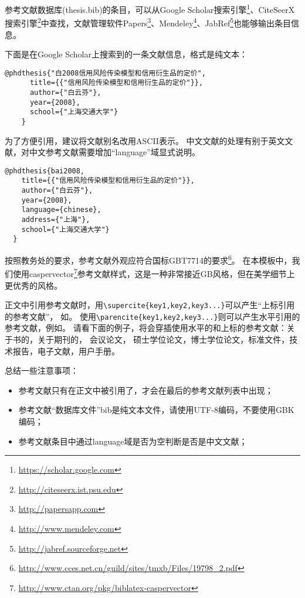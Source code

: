 参考文献数据库(thesis.bib)的条目，可以从Google Scholar搜索引擎\footnote{\url{https://scholar.google.com}}、CiteSeerX搜索引擎\footnote{\url{http://citeseerx.ist.psu.edu}}中查找，文献管理软件Papers\footnote{\url{http://papersapp.com}}、Mendeley\footnote{\url{http://www.mendeley.com}}、JabRef\footnote{\url{http://jabref.sourceforge.net}}也能够输出条目信息。

下面是在Google Scholar上搜索到的一条文献信息，格式是纯文本：

\begin{lstlisting}[caption={从Google Scholar找到的参考文献条目}, label=googlescholar, float, escapeinside="", numbers=none]
    @phdthesis{"白2008信用风险传染模型和信用衍生品的定价",
      title={{"信用风险传染模型和信用衍生品的定价"}},
      author={"白云芬"},
      year={2008},
      school={"上海交通大学"}
    } 
\end{lstlisting}

为了方便引用，建议将文献别名改用ASCII表示。
中文文献的处理有别于英文文献，对中文参考文献需要增加“language”域显式说明。

\begin{lstlisting}[caption={修改后的参考文献条目}, label=itemok, float, escapeinside="", numbers=none]
  @phdthesis{bai2008,
    title={{"信用风险传染模型和信用衍生品的定价"}},
    author={"白云芬"},
    year={2008},
    language={chinese},
    address={"上海"},
    school={"上海交通大学"}
  } 
\end{lstlisting}

按照教务处的要求，参考文献外观应符合国标GBT7714的要求\footnote{\url{http://www.cces.net.cn/guild/sites/tmxb/Files/19798_2.pdf}}。
在本模板中，我们使用caspervector\footnote{\url{http://www.ctan.org/pkg/biblatex-caspervector}}参考文献样式，这是一种非常接近GB风格，但在美学细节上更优秀的风格。

正文中引用参考文献时，用\verb+\supercite{key1,key2,key3...}+可以产生“上标引用的参考文献”，
如\supercite{Meta_CN,chen2007act,DPMG}。
使用\verb+\parencite{key1,key2,key3...}+则可以产生水平引用的参考文献，例如\parencite{JohnD,zhubajie,IEEE-1363}。
请看下面的例子，将会穿插使用水平的和上标的参考文献：关于书的\parencite{Meta_CN,JohnD,IEEE-1363}，关于期刊的\supercite{chen2007act,chen2007ewi}，
会议论文\parencite{DPMG,kocher99,cnproceed}，
硕士学位论文\parencite{zhubajie,metamori2004}，博士学位论文\supercite{shaheshang,FistSystem01,bai2008}，标准文件\parencite{IEEE-1363}，技术报告\supercite{NPB2}，电子文献\parencite{xiaoyu2001, CHRISTINE1998}，用户手册\parencite{RManual}。

总结一些注意事项：
\begin{itemize}[noitemsep,topsep=0pt,parsep=0pt,partopsep=0pt]
\item 参考文献只有在正文中被引用了，才会在最后的参考文献列表中出现；
\item 参考文献“数据库文件”bib是纯文本文件，请使用UTF-8编码，不要使用GBK编码；
\item 参考文献条目中通过language域是否为空判断是否是中文文献；
\end{itemize}

